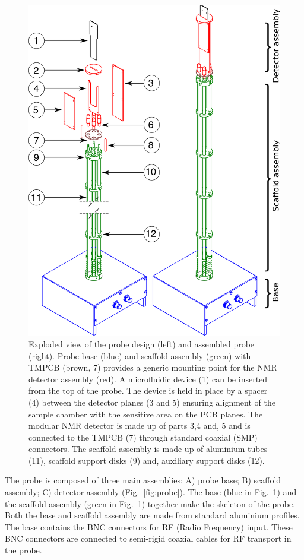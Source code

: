 \documentclass[preprint,5p]{elsarticle}
\newcommand{\fig}[1]{Fig.~\ref{#1}}
\begin{document}
\begin{figure}
\centering
\includegraphics[width=.6\linewidth,keepaspectratio=true]{./figures/ms5n17-tlp-im-181007-Probe-explode.png} 
\caption{Exploded view of the probe design (left) and assembled probe (right). 
Probe base (blue) and scaffold assembly (green) with TMPCB (brown, 7) provides a 
generic mounting point for the NMR detector assembly (red). 
A microfluidic device (1) can be inserted from the top of the probe. 
The device is held in place by a spacer (4) between the detector planes (3 and 5) 
ensuring alignment of the sample chamber with the sensitive area on the PCB planes.
The modular NMR detector is made up of parts 3,4 and, 5 and is 
connected to the TMPCB (7) through standard coaxial (SMP) connectors. 
The scaffold assembly is made up of aluminium tubes (11), scaffold support disks (9) 
and, auxiliary support disks (12).}
\label{fig:probe-explode} 
\end{figure}

The probe is composed of three main assemblies: A) probe base; B) scaffold assembly; 
C) detector assembly (\fig{fig:probe}). 
The  base (blue in \fig{fig:probe-explode}) and the scaffold assembly 
(green in \fig{fig:probe-explode}) together make the skeleton of the probe. 
Both the base and scaffold assembly are made from standard aluminium profiles. 
The base contains the BNC connectors for RF (Radio Frequency) input. 
These BNC connectors are connected to semi-rigid coaxial cables for 
RF transport in the probe.
\end{document}
